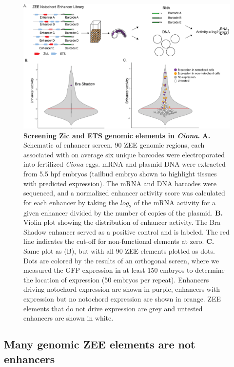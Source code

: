 \begin{figure}[p]
    \centering
    \includegraphics[scale=.5]{2_figures/Fig2_Enhancer-Screen_Expression-Distribution.png}
    \caption[Screening Zic and ETS genomic elements in \textit{Ciona}]{\textbf{Screening Zic and ETS genomic elements in \textit{Ciona}.} \textbf{A.} Schematic of enhancer screen. 90 ZEE genomic regions, each associated with on average six unique barcodes were electroporated into fertilized \textit{Ciona} eggs. mRNA and plasmid DNA were extracted from 5.5 hpf embryos (tailbud embryo shown to highlight tissues with predicted expression). The mRNA and DNA barcodes were sequenced, and a normalized enhancer activity score was calculated for each enhancer by taking the $log_2$ of the mRNA activity for a given enhancer divided by the number of copies of the plasmid. \textbf{B.} Violin plot showing the distribution of enhancer activity. The Bra Shadow enhancer served as a positive control and is labeled. The red line indicates the cut-off for non-functional elements at zero. \textbf{C.} Same plot as (B), but with all 90 ZEE elements plotted as dots. Dots are colored by the results of an orthogonal screen, where we measured the GFP expression in at least 150 embryos to determine the location of expression (50 embryos per repeat). Enhancers driving notochord expression are shown in purple, enhancers with expression but no notochord expression are shown in orange. ZEE elements that do not drive expression are grey and untested enhancers are shown in white.}
    \label{fig:2 enhancer screen schematic}
\end{figure}

\subsection{Many genomic ZEE elements are not enhancers}

